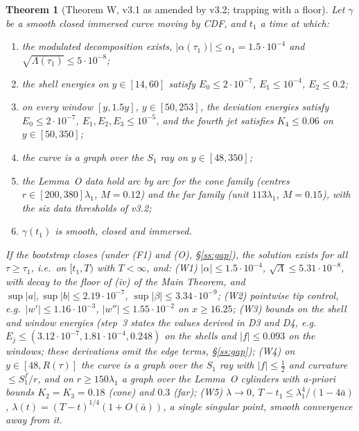 \documentclass[11pt]{amsart}
\newtheorem{theorem}{Theorem}[section]
\theoremstyle{definition}
\theoremstyle{remark}
\newcommand{\Lam}{\Lambda}
\begin{document}
\begin{theorem}[Theorem W, v3.1 as amended by v3.2; trapping with a floor]\label{thm:W}
Let $\gamma$ be a smooth closed immersed curve moving by CDF, and $t_1$ a time at which:
\begin{enumerate}[label=\textup{(H\arabic*)},leftmargin=*,itemsep=1pt]
\item the modulated decomposition exists, $|\alpha(\tau_1)|\le\alpha_1=1.5\cdot10^{-4}$ and $\sqrt{\Lam(\tau_1)}\le5\cdot10^{-8}$;
\item the shell energies on $y\in[14,60]$ satisfy $E_0\le2\cdot10^{-7}$, $E_1\le10^{-4}$, $E_2\le0.2$;
\item on every window $[y,1.5y]$, $y\in[50,253]$, the deviation energies satisfy $E_0\le2\cdot10^{-7}$, $E_1,E_2,E_3\le10^{-5}$, and the fourth jet satisfies $K_4\le0.06$ on $y\in[50,350]$;
\item the curve is a graph over the $S_1$ ray on $y\in[48,350]$;
\item the Lemma~O data hold arc by arc for the cone family (centres $r\in[200,380]\lambda_1$, $M=0.12$) and the far family (unit $113\lambda_1$, $M=0.15$), with the six data thresholds of v3.2;
\item $\gamma(t_1)$ is smooth, closed and immersed.
\end{enumerate}
If the bootstrap closes (under (F1) and (O), \S\ref{ss:gap}), the solution exists for all $\tau\ge\tau_1$, i.e.\ on $[t_1,T)$ with $T<\infty$, and: \textup{(W1)} $|\alpha|\le1.5\cdot10^{-4}$, $\sqrt\Lam\le5.31\cdot10^{-8}$, with decay to the floor of (iv) of the Main Theorem, and $\sup|a|,\sup|b|\le2.19\cdot10^{-7}$, $\sup|\beta|\le3.34\cdot10^{-9}$; \textup{(W2)} pointwise tip control, e.g.\ $|w'|\le1.16\cdot10^{-3}$, $|w''|\le1.55\cdot10^{-2}$ on $x\ge16.25$; \textup{(W3)} bounds on the shell and window energies (step~3 states the values derived in D3 and D4, e.g.\ $E_j\le(3.12\cdot10^{-7},1.81\cdot10^{-4},0.248)$ on the shells and $|f|\le0.093$ on the windows; these derivations omit the edge terms, \S\ref{ss:gap}); \textup{(W4)} on $y\in[48,R(\tau)]$ the curve is a graph over the $S_1$ ray with $|f|\le\frac12$ and curvature $\le S_1^f/r$, and on $r\ge150\lambda_1$ a graph over the Lemma~O cylinders with a-priori bounds $K_2=K_3=0.18$ (cone) and $0.3$ (far); \textup{(W5)} $\lambda\to0$, $T-t_1\le\lambda_1^4/(1-4\bar a)$, $\lambda(t)=(T-t)^{1/4}(1+O(\bar a))$, a single singular point, smooth convergence away from it.
\end{theorem}
\end{document}
